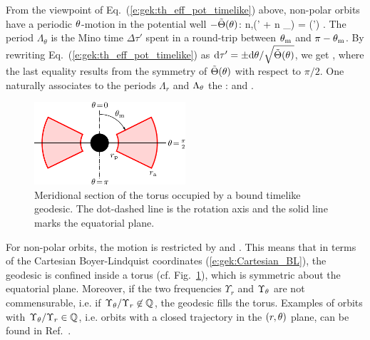 From the viewpoint of Eq.~(\ref{e:gek:th_eff_pot_timelike}) above,
non-polar orbits have a periodic $\theta$-motion in the potential well $-\tilde{\Theta}(\theta)$:
\be
    \forall n\in{},\quad \th(\tau' + n \Lambda_\th) = \th(\tau') .
\ee
The period
$\Lambda_\theta$ is the Mino time $\Delta\tau'$ spent in a round-trip
between $\theta_{\rm m}$ and $\pi-\theta_{\rm m}$.
By rewriting Eq.~(\ref{e:gek:th_eff_pot_timelike})
as $\mathrm{d}\tau' = \pm \mathrm{d} \theta / \sqrt{\tilde\Theta(\theta)}$, we get
\be
    ,
\ee
where the last equality results from the symmetry of $\tilde\Theta(\theta)$
with respect to $\pi/2$.
One naturally associates to the periods $\Lambda_r$ and $\Lambda_\theta$
the :
\be
   \qquad\mbox{and}\qquad
   \encadre{ \Upsilon_\th := \frac{2\pi}{\Lambda_\th} }.
\ee

\begin{figure}
\centerline{\includegraphics[width=0.5\textwidth]{gek_torus.pdf}}
\caption[]{\label{f:gek:torus} \footnotesize
Meridional section of the torus occupied by a bound timelike geodesic. The dot-dashed line
is the rotation axis and the solid line marks the equatorial plane.
}
\end{figure}

For non-polar orbits, the motion is restricted by
\be
  \qquad\mbox{and}\qquad
 .
\ee
This means that in terms of the Cartesian Boyer-Lindquist coordinates (\ref{e:gek:Cartesian_BL}), the
geodesic is confined inside a torus (cf. Fig.~\ref{f:gek:torus}), which is
symmetric about the equatorial plane. Moreover, if the two frequencies
$\Upsilon_r$ and $\Upsilon_\theta$ are not commensurable, i.e. if
$\Upsilon_\theta / \Upsilon_r \not\in\mathbb{Q}$, the geodesic fills the torus.
Examples of orbits with $\Upsilon_\theta / \Upsilon_r \in\mathbb{Q}$, i.e.
orbits with a closed trajectory in the $(r,\theta)$ plane, can be
found in Ref.~\cite{GrossLP12}.

